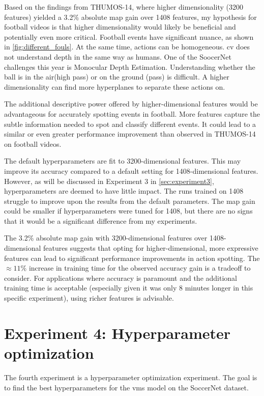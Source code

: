 Based on the findings from THUMOS-14, where higher dimensionality (3200 features) yielded a 3.2\% absolute \acrshort{map} gain over 1408 features, my hypothesis for football videos is that higher dimensionality would likely be beneficial and potentially even more critical. Football events have significant nuance, as shown in \cref{fig:different_fouls}. At the same time, actions can be homogeneous. \acrshort{cv} does not understand depth in the same way as humans. One of the SoocerNet challenges this year is Monocular Depth Estimation. Understanding whether the ball is in the air(high pass) or on the ground (pass) is difficult. A higher dimensionality can find more hyperplanes to separate these actions on. 

The additional descriptive power offered by higher-dimensional features would be advantageous for accurately spotting events in football. More features capture the subtle information needed to spot and classify different events. It could lead to a similar or even greater performance improvement than observed in THUMOS-14 on football videos.

The default hyperparameters are fit to 3200-dimensional features. This may improve its accuracy compared to a default setting for 1408-dimensional features. However, as will be discussed in Experiment 3 in \autoref{sec:experiment3}, hyperparameters are deemed to have little impact. The runs trained on 1408 struggle to improve upon the results from the default parameters. The \acrshort{map} gain could be smaller if hyperparameters were tuned for 1408, but there are no signs that it would be a significant difference from my experiments. 

The 3.2\% absolute \acrshort{map} gain with 3200-dimensional features over 1408-dimensional features suggests that opting for higher-dimensional, more expressive features can lead to significant performance improvements in action spotting. The \(\approx11\%\) increase in training time for the observed accuracy gain is a tradeoff to consider. For applications where accuracy is paramount and the additional training time is acceptable (especially given it was only 8 minutes longer in this specific experiment), using richer features is advisable.


\section{Experiment 4: Hyperparameter optimization}
\label{sec:experiment4}

The fourth experiment is a hyperparameter optimization experiment.
The goal is to find the best hyperparameters for the \acrshort{vms} model on the SoccerNet dataset.

